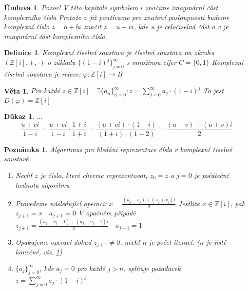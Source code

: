 \documentclass[12pt]{book}
\newtheorem{definice}{Definice}
\newtheorem{veta}{Věta}
\newtheorem*{dukaz}{Důkaz}
\newtheorem{pozn}{Poznámka}
\newtheorem*{umluva}{Úmluva}
\begin{document}
\begin{umluva}
	Pozor! V této kapitole symbolem $i$ značíme imaginární část komplexního čísla\newline
	Protože $a$ již používame pro značení posloupnosti budeme komplexní číslo $z = a +bi$ značit $z=u+vi$, kde u je celočíselná část a v je imaginární část komplexního čísla.
	\end{umluva}

\begin{definice}
	Komplexní číselná soustava je číselná soustava na okruhu $(\mathbb{Z}[i],+,\cdot)$ o základu $\{(1-i)^j\}_{j=0}^\infty$ s množinou cifer $C=\{0,1\}$\newline
	\newline
	Komplexní číselná soustava je relace:
	$\varphi:\mathbb{Z}[i]\to B$
\end{definice}

\begin{veta}
	Pro každé $z \in \mathbb{Z}[i] \quad \exists\{a_n\}_{n=0}^\infty:z=
	\sum_{j=0}^{\infty}a_j\cdot(1-i)^j$
	To jest $D(\varphi)=\mathbb{Z}[i]$
\end{veta}
\begin{dukaz}\label{kompDF}
	...
	$$\frac{u+vi}{1-i}=\frac{u+vi}{1-i}\cdot\frac{1+i}{1+i} = \frac{(u+vi)\cdot(1+i)}{(1+i)\cdot(1-2)}=\frac{(u-v)+(u+v)i}{2}$$
\end{dukaz}
\begin{pozn} Algoritmus pro hledání reprezentace čísla v komplexní číselné soustavě
	\begin{enumerate}
		\item Nechť $z$ je číslo, které chceme reprezentovat, $z_0 = z$ a $j=0$ je počáteční hodnota algoritmu	
		\item Provedeme následující operaci:\newline
		$x = \frac{(u_j-v_j)+(u_j+v_j)i}{2}$\newline
		Jestliže $x \in \mathbb{Z}[i]$, pak $z_{j+1} = x \quad a_{j+1}=0$\newline
		V opačném případě $z_{j+1} = \frac{(u_j-v_j-1)+(u_j+v_j-1)i}{2}\quad a_{j+1}=1$
		\item Opakujeme operaci dokud $z_{j+1}\ne0$, nechť $n$ je počet iterací. ($n$ je jistě konečné, viz. \ref{kompDF})
		\item $\{a_j\}_{j=0}^{\infty}$, kde $a_j=0$ pro každé $j>n$, splňuje požadavek $z=
		\sum_{j=0}^{\infty}a_j\cdot(1-i)^j$
	\end{enumerate}
\end{pozn}
\end{document}
